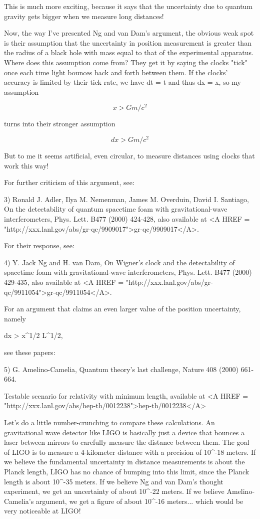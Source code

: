 This is much more exciting, because it says that the uncertainty due
to quantum gravity gets bigger when we measure long distances!  

Now, the way I've presented Ng and van Dam's argument, the obvious
weak spot is their assumption that the uncertainty in position
measurement is greater than the radius of a black hole with mass equal
to that of the experimental apparatus.  Where does this assumption
come from?  They get it by saying the clocks "tick" once each time
light bounces back and forth between them.  If the clocks' accuracy 
is limited by their tick rate, we have dt = t and thus dx = x, so my
assumption


$$

x > G m / c^{2}
$$
    
turns into their stronger assumption


$$

dx > G m / c^{2}
$$
    
But to me it seems artificial, even circular, to measure distances
using clocks that work this way!

For further criticism of this argument, see:

3) Ronald J. Adler, Ilya M. Nemenman, James M. Overduin, David I. Santiago, 
On the detectability of quantum spacetime foam with gravitational-wave
interferometers, Phys. Lett. B477 (2000) 424-428, also available at
<A HREF = "http://xxx.lanl.gov/abs/gr-qc/9909017">gr-qc/9909017</A>.

For their response, see:

4) Y. Jack Ng and H. van Dam, On Wigner's clock and the detectability
of spacetime foam with gravitational-wave interferometers,
Phys. Lett. B477 (2000) 429-435, also available at <A HREF = "http://xxx.lanl.gov/abs/gr-qc/9911054">gr-qc/9911054</A>.

For an argument that claims an even larger value of the position 
uncertainty, namely 

dx > x^{1/2} L^{1/2}, 

see these papers:

5) G. Amelino-Camelia, Quantum theory's last challenge, Nature 408
(2000) 661-664.

Testable scenario for relativity with minimum length, available at
<A HREF = "http://xxx.lanl.gov/abs/hep-th/0012238">hep-th/0012238</A>

Let's do a little number-crunching to compare these calculations.  An
gravitational wave detector like LIGO is basically just a device that
bounces a laser between mirrors to carefully measure the distance
between them.  The goal of LIGO is to measure a 4-kilometer distance
with a precision of 10^{-18} meters.  If we believe the fundamental
uncertainty in distance measurements is about the Planck length, LIGO
has no chance of bumping into this limit, since the Planck length is
about 10^{-35} meters.  If we believe Ng and van Dam's thought
experiment, we get an uncertainty of about 10^{-22} meters.  If we
believe Amelino-Camelia's argument, we get a figure of about 10^{-16}
meters... which would be very noticeable at LIGO!

